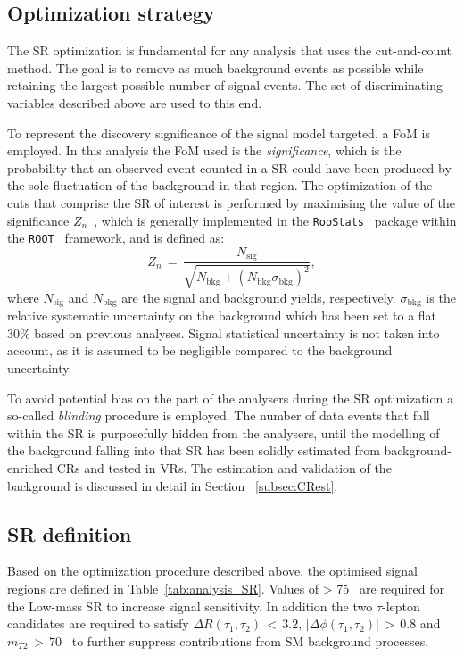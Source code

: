 	\subsection*{Optimization strategy}
	The \ac{SR} optimization is fundamental for any analysis that uses the cut-and-count method. The goal is to remove as much background events as possible while retaining the largest possible number of signal events. The set of discriminating variables described above are used to this end.
	
	To represent the discovery significance of the signal model targeted, a \ac{FoM} is employed. 
	In this analysis the \ac{FoM} used is the \textit{significance}, which is the probability that an observed event counted in a \ac{SR} could have been produced by the sole fluctuation of the background in that region.
	The optimization of the cuts that comprise the \ac{SR} of interest is performed by maximising the value of the significance $Z_n$~\cite{Zn}, which is generally implemented in the \verb+RooStats+~\cite{2010acat.confE..57M} package within the \verb+ROOT+~\cite{Brun:1997pa} framework, and is defined as:
	\begin{equation}
	Z_n\,=\,\frac{N_{\textrm{sig}}}{\sqrt{N_{\textrm{bkg}}+(N_{\textrm{bkg}}\sigma_{\textrm{bkg}})^2}},
	\end{equation}
	where $N_{\textrm{sig}}$ and $N_{\textrm{bkg}}$ are the signal and background yields, respectively. $\sigma_{\textrm{bkg}}$ is the relative systematic uncertainty on the background which has been set to a flat 30\% based on previous analyses. Signal statistical uncertainty is not taken into account, as it is assumed to be negligible compared to the background uncertainty.   
	
	To avoid potential bias on the part of the analysers during the \ac{SR} optimization a so-called \textit{blinding} procedure is employed. 
	The number of data events that fall within the \ac{SR} is purposefully hidden from the analysers, until the modelling of the background falling into that \ac{SR} has been solidly estimated from background-enriched \acp{CR} and tested in \acp{VR}. The estimation and validation of the background is discussed in detail in Section ~\ref{subsec:CRest}.
	\subsection*{SR definition}
	Based on the optimization procedure described above, the optimised signal regions are defined in Table~\ref{tab:analysis_SR}. Values of \met > 75 \gev\ are required for the Low-mass \ac{SR} to increase signal sensitivity. In addition the two $\tau$-lepton candidates are required to satisfy $\Delta R(\tau_1,\tau_2)\,<\,3.2$, $|\Delta\phi(\tau_1,\tau_2)|\,>\,0.8$ and $m_{T2}\,>\,70$ \gev\ to further suppress contributions from \ac{SM} background processes. 
		
